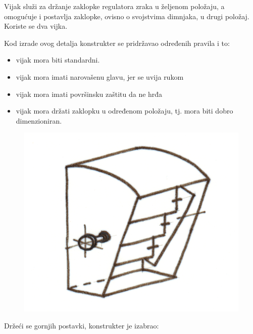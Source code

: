 \documentclass[a4paper,12pt]{article}
\numberwithin{figure}{section}
\begin{document}
Vijak služi za držanje zaklopke regulatora zraka u željenom položaju, a omogućuje i postavlja zaklopke, ovisno o svojstvima dimnjaka, u drugi položaj. Koriste se dva vijka.\par
Kod izrade ovog detalja konstrukter se pridržavao određenih pravila i to:
\begin{itemize}
\item vijak mora biti standardni.
\item vijak mora imati narovašenu glavu, jer se uvija rukom
\item vijak mora imati površinsku zaštitu da ne hrđa
\item vijak mora držati zaklopku u određenom položaju, tj. mora biti dobro dimenzioniran.
\end{itemize}
\begin{figure}[!h]
\centering
\includegraphics[scale=0.15]{../ObradaMetala/Dino/image_66.png}
\end{figure}
\FloatBarrier
Držeći se gornjih postavki, konstrukter je izabrao:
\end{document}
